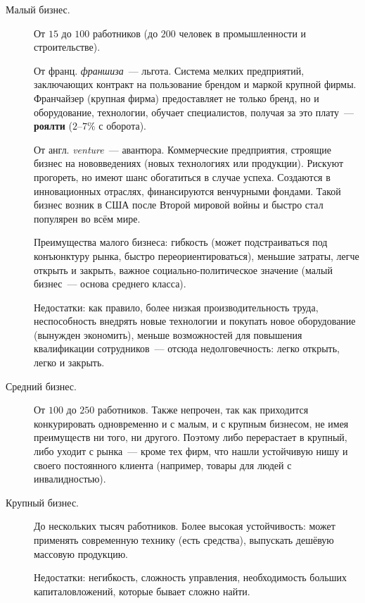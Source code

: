 \documentclass[12pt]{article}
\begin{document}
    \begin{description}
    	\item[Малый бизнес.] От $15$ до $100$ работников (до $200$ человек в промышленности и строительстве).
    	
    	\begin{note}[Франчайзинг]
    		От франц. \textit{франшиза}~--- льгота. Система мелких предприятий, заключающих контракт на пользование брендом и маркой крупной фирмы. Франчайзер (крупная фирма) предоставляет не только бренд, но и оборудование, технологии, обучает специалистов, получая за это плату~--- \textbf{роялти} ($2$--$7\%$ с оборота).
    	\end{note}
    	
    	\begin{note}
    		От англ. \textit{venture}~--- авантюра. Коммерческие предприятия, строящие бизнес на нововведениях (новых технологиях или продукции). Рискуют прогореть, но имеют шанс обогатиться в случае успеха. Создаются в инновационных отраслях, финансируются венчурными фондами. Такой бизнес возник в США после Второй мировой войны и быстро стал популярен во всём мире.
    	\end{note}
    	
    	Преимущества малого бизнеса: гибкость (может подстраиваться под конъюнктуру рынка, быстро переориентироваться), меньшие затраты, легче открыть и закрыть, важное социально-политическое значение (малый бизнес~--- основа среднего класса).
    	
    	Недостатки: как правило, более низкая производительность труда, неспособность внедрять новые технологии и покупать новое оборудование (вынужден экономить), меньше возможностей для повышения квалификации сотрудников~--- отсюда недолговечность: легко открыть, легко и закрыть.
    	
    	\item[Средний бизнес.] От $100$ до $250$ работников. Также непрочен, так как приходится конкурировать одновременно и с малым, и с крупным бизнесом, не имея преимуществ ни того, ни другого. Поэтому либо перерастает в крупный, либо уходит с рынка~--- кроме тех фирм, что нашли устойчивую нишу и своего постоянного клиента (например, товары для людей с инвалидностью).
    	
    	\item[Крупный бизнес.] До нескольких тысяч работников. Более высокая устойчивость: может применять современную технику (есть средства), выпускать дешёвую массовую продукцию.
    	
    	Недостатки: негибкость, сложность управления, необходимость больших капиталовложений, которые бывает сложно найти.
    \end{description}
\end{document}
